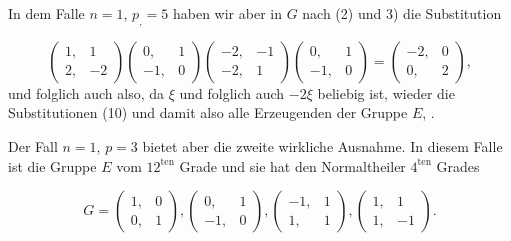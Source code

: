 
In dem Falle $n=1$, $p_{,}=5$ haben wir aber in $G$ nach (2) %
und 3) die Substitution

\[
\begin{pmatrix} 1, & 1 \\ 2, & -2 \end{pmatrix}
\begin{pmatrix} 0, & 1 \\ -1, & 0 \end{pmatrix}
\begin{pmatrix} -2, & -1 \\ -2, & 1 \end{pmatrix}
\begin{pmatrix} 0, & 1 \\ -1, & 0 \end{pmatrix}
=
\begin{pmatrix} -2, & 0 \\ 0, & 2 \end{pmatrix},
\]
und folglich auch
also, da $\xi$ und folglich auch $-2\xi$ beliebig ist, wieder die Substitutionen (10) und damit also alle Erzeugenden der Gruppe $E$,
.

Der Fall $n=1$, $p=3$ bietet aber die zweite wirkliche
Ausnahme. In diesem Falle ist die Gruppe $E$ vom $12^{\mathrm{ten}}$ Grade
und sie hat den Normaltheiler $4^{\mathrm{ten}}$ Grades

\[
G =
\begin{pmatrix} 1, & 0 \\ 0, & 1 \end{pmatrix},
\begin{pmatrix} 0, & 1 \\ -1, & 0 \end{pmatrix},
\begin{pmatrix} -1, & 1 \\ 1, & 1 \end{pmatrix},
\begin{pmatrix} 1, & 1 \\ 1, & -1 \end{pmatrix}.
\]

